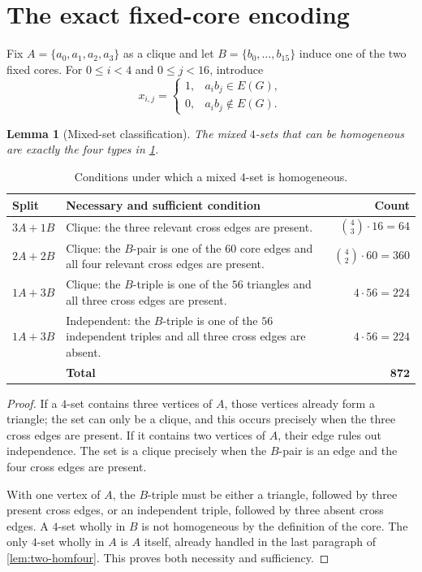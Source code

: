 \documentclass[11pt,a4paper]{article}
\newtheorem{lemma}[theorem]{Lemma}
\theoremstyle{definition}
\theoremstyle{remark}
\begin{document}
\section{The exact fixed-core encoding}\label{sec:encoding}

Fix \(A=\{a_0,a_1,a_2,a_3\}\) as a clique and let
\(B=\{b_0,\ldots,b_{15}\}\) induce one of the two fixed cores.  For
\(0\leq i<4\) and \(0\leq j<16\), introduce
\[
  x_{i,j}=\begin{cases}
  1,&a_i b_j\in E(G),\\
  0,&a_i b_j\notin E(G).
  \end{cases}
\]

\begin{lemma}[Mixed-set classification]\label{lem:mixed}
The mixed \(4\)-sets that can be homogeneous are exactly the four types in
\cref{tab:mixed}.
\end{lemma}

\begin{table}[ht]
\centering
\caption{Conditions under which a mixed \(4\)-set is homogeneous.}
\label{tab:mixed}
\begin{tabularx}{\textwidth}{@{}l X r@{}}
\toprule
Split & Necessary and sufficient condition & Count\\
\midrule
\(3A+1B\) &
Clique: the three relevant cross edges are present. &
\(\binom43\cdot16=64\)\\
\(2A+2B\) &
Clique: the \(B\)-pair is one of the \(60\) core edges and all four
relevant cross edges are present. &
\(\binom42\cdot60=360\)\\
\(1A+3B\) &
Clique: the \(B\)-triple is one of the \(56\) triangles and all three
cross edges are present. &
\(4\cdot56=224\)\\
\(1A+3B\) &
Independent: the \(B\)-triple is one of the \(56\) independent triples
and all three cross edges are absent. &
\(4\cdot56=224\)\\
\midrule
&\textbf{Total}&\(\mathbf{872}\)\\
\bottomrule
\end{tabularx}
\end{table}

\begin{proof}
If a \(4\)-set contains three vertices of \(A\), those vertices already
form a triangle; the set can only be a clique, and this occurs precisely
when the three cross edges are present.  If it contains two vertices of
\(A\), their edge rules out independence.  The set is a clique precisely
when the \(B\)-pair is an edge and the four cross edges are present.

With one vertex of \(A\), the \(B\)-triple must be either a triangle,
followed by three present cross edges, or an independent triple, followed
by three absent cross edges.  A \(4\)-set wholly in \(B\) is not
homogeneous by the definition of the core.  The only \(4\)-set wholly in
\(A\) is \(A\) itself, already handled in the last paragraph of
\cref{lem:two-homfour}.  This proves both necessity and sufficiency.
\end{proof}
\end{document}
